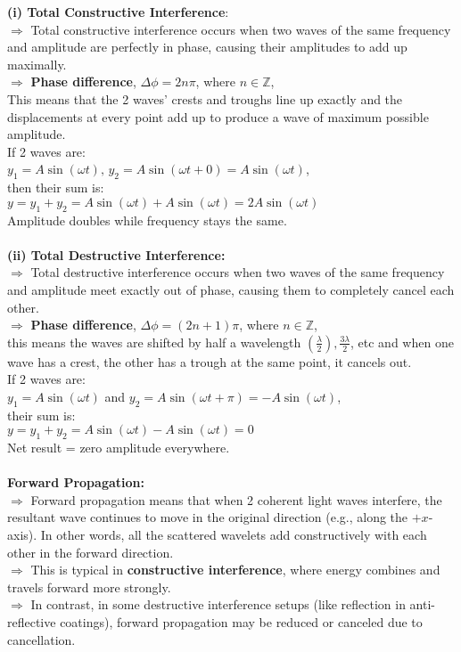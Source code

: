 \documentclass[12pt]{article}
\begin{document}
\begin{itemize}
\begin{itemize}[label=\textrightarrow]
\textbf{(i) Total Constructive Interference}:\\
$\Rightarrow$ Total constructive interference occurs when two waves of the same frequency and amplitude are perfectly in phase, causing their amplitudes to add up maximally.\\
$\Rightarrow$ \textbf{Phase difference}, $\Delta \phi=2n\pi$,  where $n\in \mathbb{Z}$,\\
This means that the 2 waves' crests and troughs line up exactly and the displacements at every point add up to produce a wave of maximum possible amplitude.\\
If 2 waves are:\\
$y_1=A\sin (\omega t),\, y_2=A\sin(\omega t+0)=A\sin(\omega t)$,\\
then their sum is:\\
$y=y_1+y_2=A\sin(\omega t)+A\sin(\omega t)=2A\sin(\omega t)$\\
Amplitude doubles while frequency stays the same.\\\\
\textbf{(ii) Total Destructive Interference:}\\
$\Rightarrow$ Total destructive interference occurs when two waves of the same frequency and amplitude meet exactly out of phase, causing them to completely cancel each other.\\
$\Rightarrow$ \textbf{Phase difference}, $\Delta \phi=(2n+1)\pi$, where $n\in \mathbb{Z}$,\\
this means the waves are shifted by half a wavelength $\left(\frac{\lambda}{2}\right), \frac{3\lambda}{2}$, etc and when one wave has a crest, the other has a trough at the same point, it cancels out.\\
If 2 waves are:\\
$y_1=A\sin(\omega t)$ and $y_2=A\sin(\omega t+\pi)=-A\sin(\omega t)$,\\
their sum is:\\
$y=y_1+y_2=A\sin(\omega t)-A\sin(\omega t)=0$\\
Net result = zero amplitude everywhere.\\\\
\textbf{Forward Propagation:}\\
$\Rightarrow$ Forward propagation means that when 2 coherent light waves interfere, the resultant wave continues to move in the original direction (e.g., along the $+x$-axis). In other words, all the scattered wavelets add
constructively with each other in the forward direction.\\
$\Rightarrow$ This is typical in \textbf{constructive interference}, where energy combines and travels forward more strongly.\\
$\Rightarrow$ In contrast, in some destructive interference setups (like reflection in anti-reflective coatings), forward propagation may be reduced or canceled due to cancellation.
\end{itemize}
\end{itemize}
\end{document}
